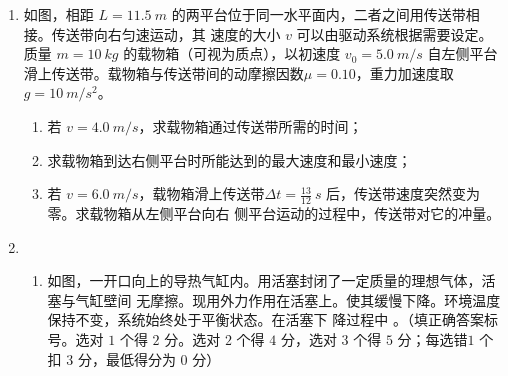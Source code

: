 \begin{enumerate}






\item
如图，相距 $ L=11.5 \ m $ 的两平台位于同一水平面内，二者之间用传送带相接。传送带向右匀速运动，其
速度的大小 $ v $ 可以由驱动系统根据需要设定。质量 $ m=10 \ kg $ 的载物箱（可视为质点），以初速度 $ v_{0} =5.0 \ m/s $ 自左侧平台滑上传送带。载物箱与传送带间的动摩擦因数$ \mu =0.10 $，重力加速度取 $ g=10 \ m/s^{2} $。
\begin{enumerate}
\item
若 $ v=4.0 \ m/s $，求载物箱通过传送带所需的时间；
\item 
求载物箱到达右侧平台时所能达到的最大速度和最小速度；
\item 
若 $ v=6.0 \ m/s $，载物箱滑上传送带$\Delta t=\frac{13}{12} \ s $ 后，传送带速度突然变为零。求载物箱从左侧平台向右
侧平台运动的过程中，传送带对它的冲量。

\end{enumerate}
\begin{figure}[h!]
\flushright

\end{figure}






\newpage




\item 
\begin{enumerate}
\item
如图，一开口向上的导热气缸内。用活塞封闭了一定质量的理想气体，活塞与气缸壁间
无摩擦。现用外力作用在活塞上。使其缓慢下降。环境温度保持不变，系统始终处于平衡状态。在活塞下
降过程中 \underlinegap 。（填正确答案标号。选对 $ 1 $ 个得 $ 2 $ 分。选对 $ 2 $ 个得 $ 4 $ 分，选对 $ 3 $ 个得 $ 5 $ 分；每选错$ 1 $ 个扣 $ 3 $ 分，最低得分为 $ 0 $ 分）
\begin{figure}[h!]
\centering

\end{figure}


\end{enumerate}
\end{enumerate}
